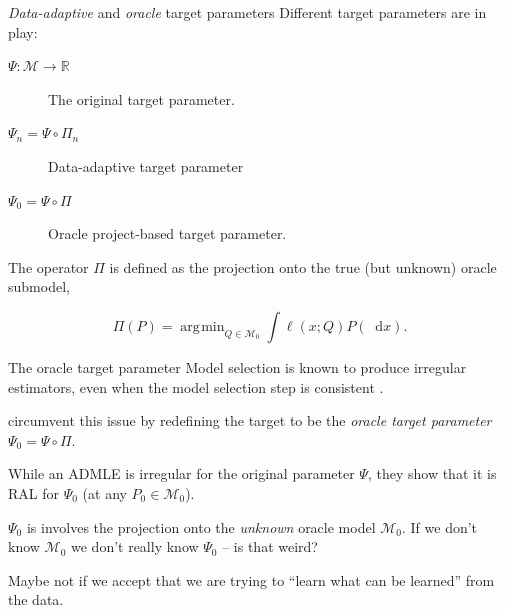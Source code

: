 \documentclass[smaller]{beamer}\usepackage{listings}
\newcommand{\R}{\mathbb{R}}
\newcommand*\diff{\mathop{}\!\mathrm{d}}
\newcommand{\1}{\mathds{1}}
\DeclareMathOperator*{\argmin}{\arg\!\min}
\begin{document}
\begin{frame}[label={sec:org71370ff}]{\emph{Data-adaptive} and \emph{oracle} target parameters}
Different target parameters are in play:

\begin{description}
\item[{\(\Psi \colon \mathcal{M} \rightarrow \R\)}] The original target parameter.
\item[{\(\Psi_n = \Psi \circ \Pi_n\)}] Data-adaptive target parameter
\item[{\(\Psi_0 = \Psi \circ \Pi\)}] Oracle project-based target parameter.
\end{description}

\vfill

The operator \(\Pi\) is defined as the projection onto the true (but unknown)
oracle submodel,

\begin{equation*}
  \Pi(P) = \argmin_{Q \in \mathcal{M}_0}\int \ell(x; Q) P(\diff x).
\end{equation*}
\end{frame}

\begin{frame}[label={sec:org9daa758}]{The oracle target parameter}
Model selection is known to produce irregular estimators, even when the model
selection step is consistent \citep{leeb2005model}.

\vfill

\cite{van2023adaptive} circumvent this issue by redefining the target to be the
\emph{oracle target parameter} \(\Psi_0 = \Psi \circ \Pi\).

\vfill

While an ADMLE is irregular for the original parameter \(\Psi\), they show that it
is RAL for \(\Psi_0\) (at any \(P_0 \in \mathcal{M}_0\)).

\vfill

\(\Psi_0\) is involves the projection onto the \emph{unknown} oracle model \(\mathcal{M}_0\). If we don't know \(\mathcal{M}_0\) we don't really know
\(\Psi_0\) -- is that weird?

\vfill

Maybe not if we accept that we are trying to ``learn what can be learned'' from
the data.
\end{frame}
\end{document}
